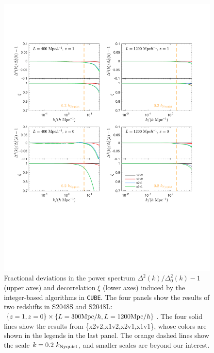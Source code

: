 \documentclass[10pt,twocolumn,preprint]{emulateapj}
\begin{document}
\begin{figure}
\centering
  \includegraphics[width=1.0\linewidth]{diff_power.pdf}
 \caption{Fractional deviations in the power spectrum $\Delta^2(k)/\Delta^2_0(k)-1$ (upper axes) and decorrelation $\xi$ (lower axes) induced by the integer-based algorithms in {\tt CUBE}. The four panels show the results of two redshifts in S2048S and S2048L: $\{ z=1, z=0 \} \times \{ L=300{\rm Mpc}/h, L=1200{\rm Mpc}/h \}$. The four solid lines show the results from \{x2v2,x1v2,x2v1,x1v1\}, whose colors are shown in the legends in the last panel. The orange dashed lines show the scale $k=0.2\ k_{\rm Nyquist}$, and smaller scales are beyond our interest.}
\label{fig.ccc}
\end{figure}
\end{document}
